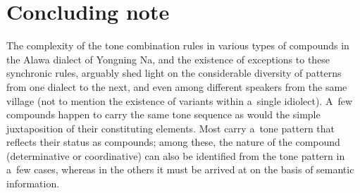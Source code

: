 \section{Concluding note}
\label{sec:concludingnotes}

The complexity of the tone combination rules in various types of compounds in the Alawa dialect of Yongning Na, and the existence of exceptions to these synchronic rules, arguably shed light on the considerable diversity of
patterns from one dialect to the next, and even among different speakers from the same village
(not to mention the existence of variants within a~single idiolect). A~few compounds happen to carry
the same tone sequence as would the simple juxtaposition of their constituting elements. Most carry
a~tone pattern that reflects their status as compounds; among these, the nature of the compound
(determinative or coordinative) can also be identified from the tone pattern in a~few cases, whereas in the others it
must be arrived at on the basis of semantic information.

